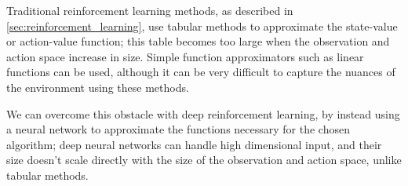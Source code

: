 

Traditional reinforcement learning methods, as described in
\autoref{sec:reinforcement_learning}, use tabular methods to approximate the
state-value or action-value function; this table becomes too large when the
observation and action space increase in size. Simple function approximators
such as linear functions can be used, although it can be very difficult to
capture the nuances of the environment using these methods.

We can overcome this obstacle with deep reinforcement learning, by instead
using a neural network to approximate the functions necessary for the chosen
algorithm; deep neural networks can handle high dimensional input, and their
size doesn't scale directly with the size of the observation and action space,
unlike tabular methods.
